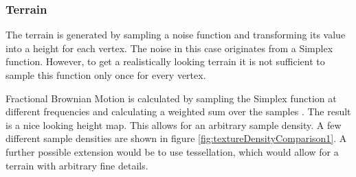 \newpage
\subsubsection{Terrain}
The terrain is generated by sampling a noise function and transforming its value into a height for each vertex. The noise in this case originates from a Simplex function. However, to get a realistically looking terrain it is not sufficient to sample this function only once for every vertex.

Fractional Brownian Motion is calculated by sampling the Simplex function at different frequencies and calculating a weighted sum over the samples \cite{FracBrownMotion}. The result is a nice looking height map. This allows for an arbitrary sample density. A few different sample densities are shown in figure \ref{fig:textureDensityComparison1}. A further possible extension would be to use tessellation, which would allow for a terrain with arbitrary fine details.  

